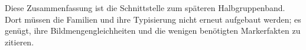 \documentclass[main.tex]{subfiles}
\begin{document}

Diese Zusammenfassung ist die Schnittstelle zum späteren Halbgruppenband.
Dort müssen die Familien und ihre Typisierung nicht erneut aufgebaut werden;
es genügt, ihre Bildmengengleichheiten und die wenigen benötigten
Markerfakten zu zitieren.
\end{document}
